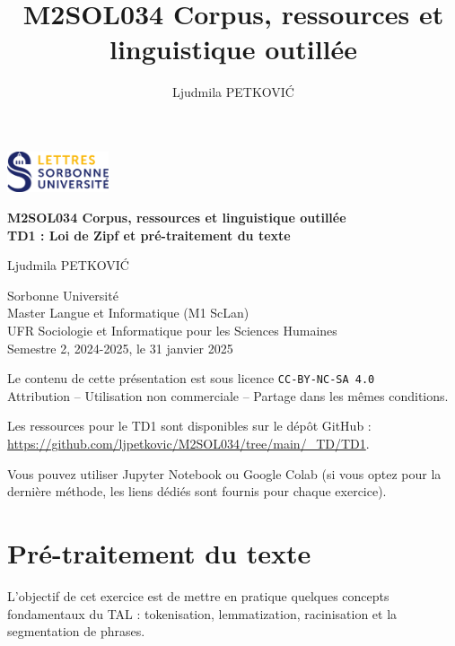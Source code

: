 \documentclass[xcolor={table,usenames,dvipsnames}]{article}
\author{Ljudmila PETKOVI\'C}
\title{\textbf{\textsc{M2SOL034} Corpus, ressources et linguistique outillée}}
\begin{document}
	
	\begin{center}
		\includegraphics[width=3cm]{img/logo.png} %
	\end{center}
	
	\begin{tcolorbox}[colback=myblue!10, colframe=myblue, width=\textwidth, sharp corners, boxrule=1pt]
		\centering
		\Large \textbf{\textsc{M2SOL034} Corpus, ressources et linguistique outillée\\{\large\textsc{TD1} : Loi de Zipf et pré-traitement du texte}}
	\end{tcolorbox}
	
	\begin{center}
		Ljudmila PETKOVI\'C
		
		{\small Sorbonne Université\\Master \og{}Langue et Informatique\fg{} (\textsc{M1} ScLan)\\\textsc{UFR} Sociologie et Informatique pour les Sciences Humaines\\Semestre 2, 2024-2025, le 31 janvier 2025}
		
		
		{\scriptsize Le contenu de cette présentation est sous licence \texttt{CC-BY-NC-SA 4.0}\\Attribution -- Utilisation non commerciale -- Partage dans les mêmes conditions.\\}
		\href{https://creativecommons.org/licenses/by-nc-sa/4.0/deed.fr}{\ccbyncsa}
		
	\end{center}
	
\hline


		
	\tableofcontents
	
	\bigskip
	Les ressources pour le \textsc{TD1} sont disponibles sur le dépôt GitHub :\\ \url{https://github.com/ljpetkovic/M2SOL034/tree/main/\_TD/TD1}. 
	
	Vous pouvez utiliser Jupyter Notebook ou Google Colab (si vous optez pour la dernière méthode, les liens dédiés sont fournis pour chaque exercice).
	
	\section{Pré-traitement du texte}  %
	L'objectif de cet exercice est de mettre en pratique quelques concepts fondamentaux du \textsc{TAL} : tokenisation, lemmatization, racinisation et la segmentation de phrases.
	
\end{document}
